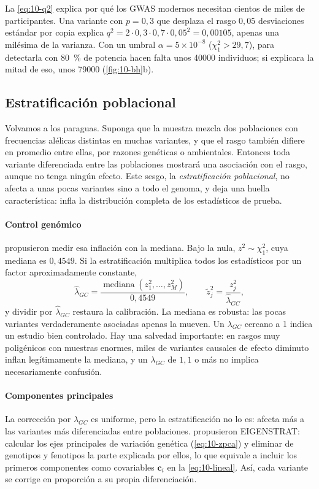 La \cref{eq:10-q2} explica por qué los GWAS modernos necesitan cientos de miles de participantes. Una variante con $p=0{,}3$ que desplaza el rasgo $0{,}05$ desviaciones estándar por copia explica $q^2=2\cdot0{,}3\cdot0{,}7\cdot0{,}05^2=0{,}00105$, apenas una milésima de la varianza. Con un umbral $\alpha=5\times10^{-8}$ ($\chi^2_1>29{,}7$), para detectarla con \SI{80}{\percent} de potencia hacen falta unos \num{40000} individuos; si explicara la mitad de eso, unos \num{79000} (\cref{fig:10-bh}b).

\subsection{Estratificación poblacional}

Volvamos a los paraguas. Suponga que la muestra mezcla dos poblaciones con frecuencias alélicas distintas en muchas variantes, y que el rasgo también difiere en promedio entre ellas, por razones genéticas o ambientales. Entonces toda variante diferenciada entre las poblaciones mostrará una asociación con el rasgo, aunque no tenga ningún efecto. Este sesgo, la \emph{estratificación poblacional}, no afecta a unas pocas variantes sino a todo el genoma, y deja una huella característica: infla la distribución completa de los estadísticos de prueba.

\paragraph{Control genómico} \textcite{c10-devlin1999} propusieron medir esa inflación con la mediana. Bajo la nula, $z^2\sim\chi^2_1$, cuya mediana es $0{,}4549$. Si la estratificación multiplica todos los estadísticos por un factor aproximadamente constante,
\begin{equation}\label{eq:10-lambda}
\hat\lambda_{GC} = \frac{\operatorname{mediana}(z_1^2,\dots,z_M^2)}{0{,}4549},\qquad \tilde z_j^2 = \frac{z_j^2}{\hat\lambda_{GC}},
\end{equation}
y dividir por $\hat\lambda_{GC}$ restaura la calibración. La mediana es robusta: las pocas variantes verdaderamente asociadas apenas la mueven. Un $\lambda_{GC}$ cercano a 1 indica un estudio bien controlado. Hay una salvedad importante: en rasgos muy poligénicos con muestras enormes, miles de variantes causales de efecto diminuto inflan legítimamente la mediana, y un $\lambda_{GC}$ de $1{,}1$ o más no implica necesariamente confusión.

\paragraph{Componentes principales} La corrección por $\lambda_{GC}$ es uniforme, pero la estratificación no lo es: afecta más a las variantes más diferenciadas entre poblaciones. \textcite{c10-price2006} propusieron EIGENSTRAT: calcular los ejes principales de variación genética (\cref{eq:10-zpca}) y eliminar de genotipos y fenotipos la parte explicada por ellos, lo que equivale a incluir los primeros componentes como covariables $\mathbf{c}_i$ en la \cref{eq:10-lineal}. Así, cada variante se corrige en proporción a su propia diferenciación.

